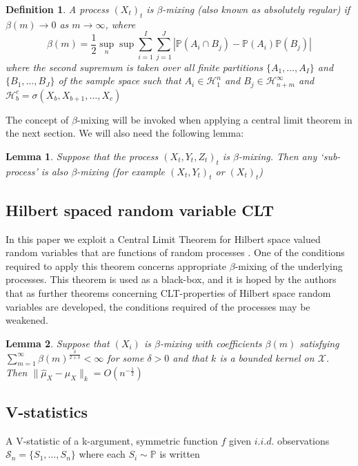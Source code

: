 \documentclass[]{article}
\newtheorem{definition}{Definition}
\newtheorem{lemma}{Lemma}
\begin{document}
\begin{definition}
A process $(X_t)_{t}$ is \emph{$\beta$-mixing} (also known as \emph{absolutely regular}) if $\beta(m) \longrightarrow 0$ as $m\longrightarrow \infty$, where
\[ \beta(m) = \frac{1}{2} \sup_n \sup \sum_{i=1}^I \sum_{j=1}^J | \mathbb{P}(A_i \cap B_j) - \mathbb{P}(A_i)\mathbb{P}(B_j)| \]
where the second supremum is taken  over all finite partitions $\{A_1,\ldots, A_I \}$ and  $\{B_1,\ldots, B_J\}$ of the sample space such that $A_i \in \mathcal{H}_1^n$ and $B_j \in \mathcal{H}_{n+m}^\infty$ and $\mathcal{H}_b^c = \sigma(X_b,X_{b+1},\ldots,X_{c})$
\end{definition}

The concept of $\beta$-mixing will be invoked when applying a central limit theorem in the next section. We will also need the following lemma:

\begin{lemma}\label{lemma:beta}
Suppose that the process $(X_t,Y_t,Z_t)_t$ is $\beta$-mixing. Then any `sub-process' is also $\beta$-mixing (for example $(X_t,Y_t)_t$ or $(X_t)_t$)
\end{lemma}

\subsection{Hilbert spaced random variable CLT}

In this paper we exploit a Central Limit Theorem for Hilbert space valued random variables that are functions of random processes \cite{dehling2015bootstrap}. One of the conditions required to apply this theorem concerns appropriate $\beta$-mixing of the underlying processes. This theorem is used as a black-box, and it is hoped by the authors that as further theorems concerning CLT-properties of Hilbert space random variables are developed, the conditions required of the processes may be weakened.

\begin{lemma}\label{lemma:hilbertCLT}
Suppose that $(X_i)$ is $\beta$-mixing with coefficients $\beta(m)$ satisfying $\sum_{m=1}^{\infty}\beta(m)^{\frac{\delta}{2+\delta}}<\infty$ for some $\delta > 0$ and that $k$ is a bounded kernel on $\mathcal{X}$. Then $\|\hat\mu_X - \mu_X\|_k = O(n^{-\frac{1}{2}})$

\end{lemma}


\subsection{V-statistics}
A V-statistic \cite{serfling2009approximation} of a k-argument, symmetric function $f$ given $i.i.d. $ observations $\mathcal{S}_n = \{S_1,\ldots,S_n\}$ where each $S_i \sim \mathbb{P}$ is written
\end{document}
